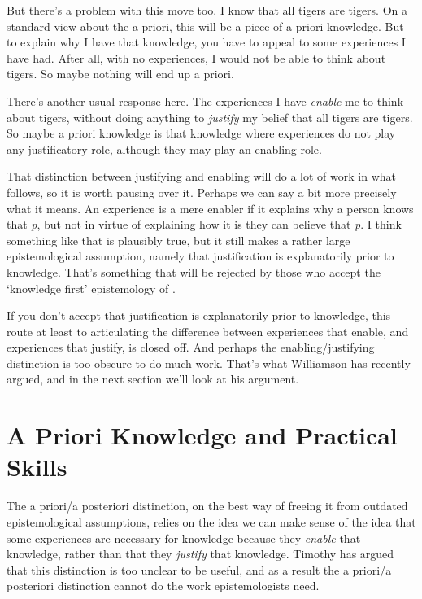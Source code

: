 But there's a problem with this move too. I know that all tigers are tigers. On a standard view about the a priori, this will be a piece of a priori knowledge. But to explain why I have that knowledge, you have to appeal to some experiences I have had. After all, with no experiences, I would not be able to think about tigers. So maybe nothing will end up a priori.

There's another usual response here. The experiences I have \emph{enable} me to think about tigers, without doing anything to \emph{justify} my belief that all tigers are tigers. So maybe a priori knowledge is that knowledge where experiences do not play any justificatory role, although they may play an enabling role.

That distinction between justifying and enabling will do a lot of work in what follows, so it is worth pausing over it. Perhaps we can say a bit more precisely what it means. An experience is a mere enabler if it explains why a person knows that \emph{p}, but not in virtue of explaining how it is they can believe that \emph{p}. I think something like that is plausibly true, but it still makes a rather large epistemological assumption, namely that justification is explanatorily prior to knowledge. That's something that will be rejected by those who accept the `knowledge first' epistemology of  \citet{Williamson2000-WILKAI}.

If you don't accept that justification is explanatorily prior to knowledge, this route at least to articulating the difference between experiences that enable, and experiences that justify, is closed off. And perhaps the enabling/justifying distinction is too obscure to do much work. That's what Williamson has recently argued, and in the next section we'll look at his argument. 

\section{A Priori Knowledge and Practical Skills}
\label{aprioriknowledgeandpracticalskills}

The a priori\slash a posteriori distinction, on the best way of freeing it from outdated epistemological assumptions, relies on the idea we can make sense of the idea that some experiences are necessary for knowledge because they \emph{enable} that knowledge, rather than that they \emph{justify} that knowledge. Timothy  \citet{Williamson2013} has argued that this distinction is too unclear to be useful, and as a result the a priori\slash a posteriori distinction cannot do the work epistemologists need. 

